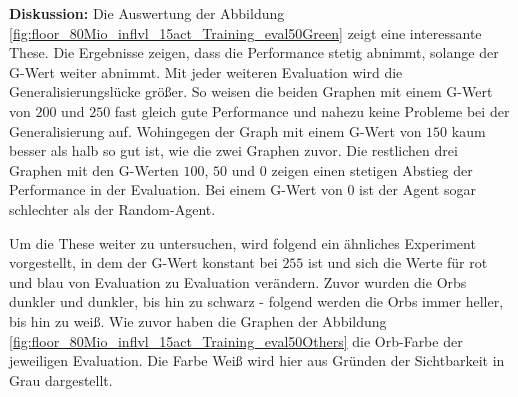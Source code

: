 \textbf{Diskussion:} Die Auswertung der Abbildung \ref{fig:floor_80Mio_inflvl_15act_Training_eval50Green} zeigt eine interessante These. Die Ergebnisse zeigen, dass die Performance stetig abnimmt, solange der G-Wert weiter abnimmt. Mit jeder weiteren Evaluation wird die Generalisierungslücke größer. So weisen die beiden Graphen mit einem G-Wert von $200$ und $250$ fast gleich gute Performance und nahezu keine Probleme bei der Generalisierung auf. Wohingegen der Graph mit einem G-Wert von $150$ kaum besser als halb so gut ist, wie die zwei Graphen zuvor. Die restlichen drei Graphen mit den G-Werten $100$, $50$ und $0$ zeigen einen stetigen Abstieg der Performance in der Evaluation. Bei einem G-Wert von 0 ist der Agent sogar schlechter als der Random-Agent.

Um die These weiter zu untersuchen, wird folgend ein ähnliches Experiment vorgestellt, in dem der G-Wert konstant bei $255$ ist und sich die Werte für rot und blau von Evaluation zu Evaluation verändern. Zuvor wurden die Orbs dunkler und dunkler, bis hin zu schwarz - folgend werden die Orbs immer heller, bis hin zu weiß. Wie zuvor haben die Graphen der Abbildung \ref{fig:floor_80Mio_inflvl_15act_Training_eval50Others} die Orb-Farbe der jeweiligen Evaluation. Die Farbe Weiß wird hier aus Gründen der Sichtbarkeit in Grau dargestellt.  \newline

